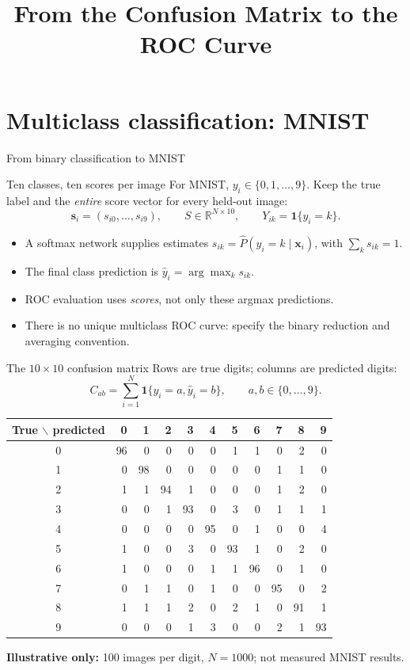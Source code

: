\documentclass[aspectratio=169,11pt]{beamer}
\begin{document}
\section{Multiclass classification: MNIST}
\title[Multiclass ROC curves]{From the Confusion Matrix to the ROC Curve}

\begin{frame}{From binary classification to MNIST}
\begin{block}{Ten classes, ten scores per image}
For MNIST, $y_i\in\{0,1,\ldots,9\}$. Keep the true label and the
\emph{entire} score vector for every held-out image:
\[
  \mathbf s_i=(s_{i0},\ldots,s_{i9}),\qquad
  S\in\mathbb R^{N\times10},\qquad Y_{ik}=\mathbf1\{y_i=k\}.
\]
\end{block}
\begin{itemize}
\item A softmax network supplies estimates $s_{ik}=\widehat P(y_i=k\mid\mathbf x_i)$,
      with $\sum_k s_{ik}=1$.
\item The final class prediction is $\widehat y_i=\arg\max_k s_{ik}$.
\item ROC evaluation uses \emph{scores}, not only these argmax predictions.
\item There is no unique multiclass ROC curve: specify the binary reduction
      and averaging convention.
\end{itemize}
\end{frame}

\begin{frame}{The $10\times10$ confusion matrix}
\small
Rows are true digits; columns are predicted digits:
\[
 C_{ab}=\sum_{i=1}^{N}\mathbf1\{y_i=a,\widehat y_i=b\},
 \qquad a,b\in\{0,\ldots,9\}.
\]
\centering
\setlength{\tabcolsep}{6pt}
{\footnotesize
\begin{tabular}{c|rrrrrrrrrr}
\toprule
True $\backslash$ predicted & 0&1&2&3&4&5&6&7&8&9\\\midrule
0&96&0&0&0&0&1&1&0&2&0\\
1&0&98&0&0&0&0&0&1&1&0\\
2&1&1&94&1&0&0&0&1&2&0\\
3&0&0&1&93&0&3&0&1&1&1\\
4&0&0&0&0&95&0&1&0&0&4\\
5&1&0&0&3&0&93&1&0&2&0\\
6&1&0&0&0&1&1&96&0&1&0\\
7&0&1&1&0&1&0&0&95&0&2\\
8&1&1&1&2&0&2&1&0&91&1\\
9&0&0&0&1&3&0&0&2&1&93\\\bottomrule
\end{tabular}
\par}
\par\vspace{.6em}
\raggedright
\textbf{Illustrative only:} 100 images per digit, $N=1000$; not measured MNIST results.
\end{frame}
\end{document}
